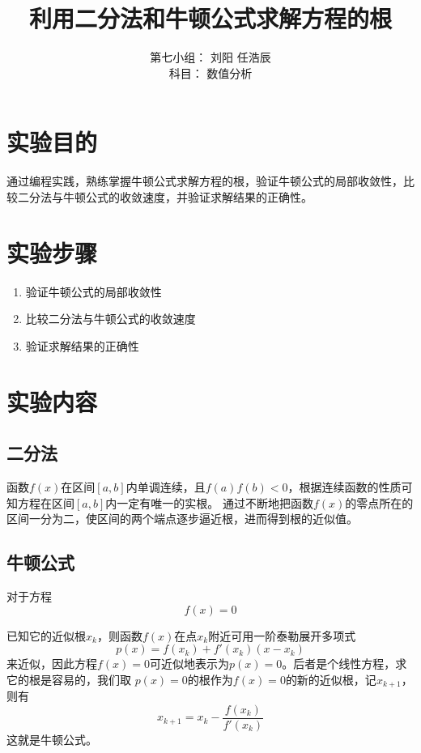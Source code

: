 \documentclass[lang=cn,11pt,a4paper]{elegantpaper}
\title{利用二分法和牛顿公式求解方程的根}
\author{第七小组： 刘阳 \quad 任浩辰 \\ 科目： 数值分析}
\date{\zhtoday}
\begin{document}
\maketitle

\section{实验目的}
通过编程实践，熟练掌握牛顿公式求解方程的根，验证牛顿公式的局部收敛性，比较二分法与牛顿公式的收敛速度，并验证求解结果的正确性。

\section{实验步骤}
\begin{enumerate}
  \item 验证牛顿公式的局部收敛性
  \item 比较二分法与牛顿公式的收敛速度
  \item 验证求解结果的正确性
\end{enumerate}

\section{实验内容}
\subsection{二分法}
  函数$f(x)$在区间$[a,b]$内单调连续，且$f(a)f(b)<0$，根据连续函数的性质可知方程在区间$[a,b]$内一定有唯一的实根。
  通过不断地把函数$f(x)$的零点所在的区间一分为二，使区间的两个端点逐步逼近根，进而得到根的近似值。

\subsection{牛顿公式}
  对于方程
  \begin{equation}
    f(x)=0
  \end{equation}
  
  已知它的近似根$x_k$，则函数$f(x)$在点$x_k$附近可用一阶泰勒展开多项式
  \begin{equation}
    p(x)=f(x_k)+f'(x_k)(x-x_k)
  \end{equation}
  来近似，因此方程$f(x)=0$可近似地表示为$p(x)=0$。后者是个线性方程，求它的根是容易的，我们取 
  $p(x)=0$的根作为$f(x)=0$的新的近似根，记$x_{k+1}$，则有
  \begin{equation}
    x_{k+1}=x_k-\frac{f(x_k)}{f'(x_k)}
  \end{equation}
  这就是牛顿公式。
\end{document}
